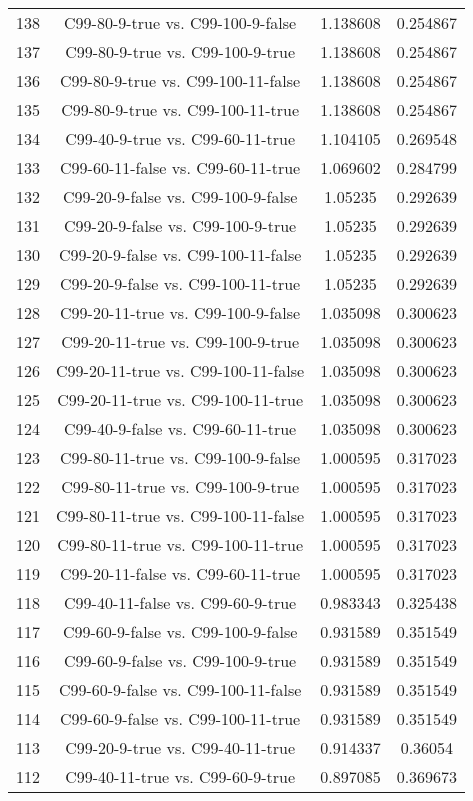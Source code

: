 \documentclass[a4paper,10pt]{article}
\begin{document}
\begin{landscape}
\begin{table}[!htp]
\begin{tabular}{cccc}
138&C99-80-9-true vs. C99-100-9-false&1.138608&0.254867\\
137&C99-80-9-true vs. C99-100-9-true&1.138608&0.254867\\
136&C99-80-9-true vs. C99-100-11-false&1.138608&0.254867\\
135&C99-80-9-true vs. C99-100-11-true&1.138608&0.254867\\
134&C99-40-9-true vs. C99-60-11-true&1.104105&0.269548\\
133&C99-60-11-false vs. C99-60-11-true&1.069602&0.284799\\
132&C99-20-9-false vs. C99-100-9-false&1.05235&0.292639\\
131&C99-20-9-false vs. C99-100-9-true&1.05235&0.292639\\
130&C99-20-9-false vs. C99-100-11-false&1.05235&0.292639\\
129&C99-20-9-false vs. C99-100-11-true&1.05235&0.292639\\
128&C99-20-11-true vs. C99-100-9-false&1.035098&0.300623\\
127&C99-20-11-true vs. C99-100-9-true&1.035098&0.300623\\
126&C99-20-11-true vs. C99-100-11-false&1.035098&0.300623\\
125&C99-20-11-true vs. C99-100-11-true&1.035098&0.300623\\
124&C99-40-9-false vs. C99-60-11-true&1.035098&0.300623\\
123&C99-80-11-true vs. C99-100-9-false&1.000595&0.317023\\
122&C99-80-11-true vs. C99-100-9-true&1.000595&0.317023\\
121&C99-80-11-true vs. C99-100-11-false&1.000595&0.317023\\
120&C99-80-11-true vs. C99-100-11-true&1.000595&0.317023\\
119&C99-20-11-false vs. C99-60-11-true&1.000595&0.317023\\
118&C99-40-11-false vs. C99-60-9-true&0.983343&0.325438\\
117&C99-60-9-false vs. C99-100-9-false&0.931589&0.351549\\
116&C99-60-9-false vs. C99-100-9-true&0.931589&0.351549\\
115&C99-60-9-false vs. C99-100-11-false&0.931589&0.351549\\
114&C99-60-9-false vs. C99-100-11-true&0.931589&0.351549\\
113&C99-20-9-true vs. C99-40-11-true&0.914337&0.36054\\
112&C99-40-11-true vs. C99-60-9-true&0.897085&0.369673\\

\end{tabular}
\end{table}
\end{landscape}
\end{document}

